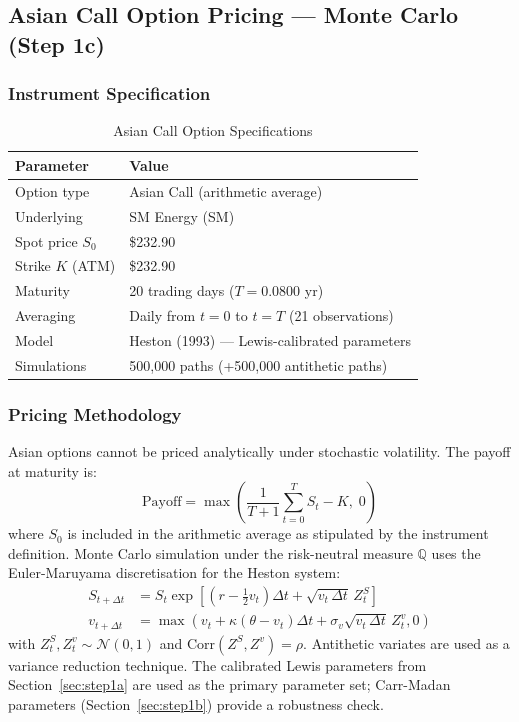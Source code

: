 \documentclass[12pt,a4paper]{article}
\newcommand{\thead}[1]{\cellcolor{headernavy}\color{white}\textbf{#1}}
\newcommand{\rowA}{\rowcolor{white}}
\newcommand{\rowB}{\rowcolor{rowgray}}
\begin{document}
\subsection{Asian Call Option Pricing --- Monte Carlo (Step 1c)}
\label{sec:step1c}

\subsubsection{Instrument Specification}

\begin{table}[H]
  \centering
  \caption{Asian Call Option Specifications}
  \label{tab:asian_spec}
  \begin{tabular}{ll}
    \hline
    \thead{Parameter} & \thead{Value} \\
    \hline
    \rowA Option type    & Asian Call (arithmetic average) \\
    \rowB Underlying     & SM Energy (SM) \\
    \rowA Spot price $S_0$   & \$232.90 \\
    \rowB Strike $K$ (ATM)   & \$232.90 \\
    \rowA Maturity       & 20 trading days ($T = 0.0800$ yr) \\
    \rowB Averaging      & Daily from $t=0$ to $t=T$ (21 observations) \\
    \rowA Model          & Heston (1993) --- Lewis-calibrated parameters \\
    \rowB Simulations    & 500,000 paths (+500,000 antithetic paths) \\
    \hline
  \end{tabular}
\end{table}

\subsubsection{Pricing Methodology}

Asian options cannot be priced analytically under stochastic volatility. The payoff at maturity is:
\[
  \text{Payoff} = \max\!\left(\frac{1}{T+1}\sum_{t=0}^{T} S_t - K,\; 0\right)
\]
where $S_0$ is included in the arithmetic average as stipulated by the instrument definition. Monte Carlo simulation under the risk-neutral measure $\mathbb{Q}$ uses the Euler-Maruyama discretisation for the Heston system:
\begin{align*}
  S_{t+\Delta t} &= S_t\exp\!\left[(r - \tfrac{1}{2}v_t)\Delta t + \sqrt{v_t\,\Delta t}\,Z_t^S\right] \\
  v_{t+\Delta t} &= \max\!\left(v_t + \kappa(\theta - v_t)\Delta t + \sigma_v\sqrt{v_t\,\Delta t}\,Z_t^v, 0\right)
\end{align*}
with $Z_t^S, Z_t^v \sim \mathcal{N}(0,1)$ and $\text{Corr}(Z^S, Z^v) = \rho$. Antithetic variates are used as a variance reduction technique. The calibrated Lewis parameters from Section~\ref{sec:step1a} are used as the primary parameter set; Carr-Madan parameters (Section~\ref{sec:step1b}) provide a robustness check.
\end{document}

